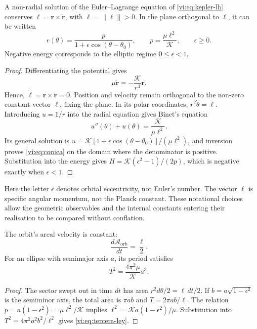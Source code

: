\begin{proposition}
\label{vi:prop:conica}
A non-radial solution of the Euler--Lagrange equation of
\eqref{vi:eq:kepler-lh} conserves
$\boldsymbol\ell=\mathbf r\times\dot{\mathbf r}$, with
$\ell=\|\boldsymbol\ell\|>0$. In the plane orthogonal to
$\boldsymbol\ell$, it can be written
\begin{equation}
 r(\theta)=\frac{p}{1+\epsilon\cos(\theta-\theta_0)},
 \qquad p=\frac{\mu\ell^2}{\mathcal K},
 \qquad \epsilon\geq0.
 \label{vi:eq:conica}
\end{equation}
Negative energy corresponds to the elliptic regime
$0\leq\epsilon<1$.
\end{proposition}
\begin{proof}
Differentiating the potential gives
\begin{equation}
 \mu\ddot{\mathbf r}=-\frac{\mathcal K}{r^3}\mathbf r.
 \label{vi:eq:fuerza-central}
\end{equation}
Hence,
$\dot{\boldsymbol\ell}=\mathbf r\times\ddot{\mathbf r}=0$.
Position and velocity remain orthogonal to the
non-zero constant vector $\boldsymbol\ell$, fixing the plane.
In its polar coordinates, $r^2\dot\theta=\ell$. Introducing
$u=1/r$ into the radial equation gives Binet's equation
\[
 u''(\theta)+u(\theta)=\frac{\mathcal K}{\mu\ell^2}.
\]
Its general solution is
$u=\mathcal K[1+\epsilon\cos(\theta-\theta_0)]/(\mu\ell^2)$,
and inversion proves \eqref{vi:eq:conica} on the domain
where the denominator is positive. Substitution into
the energy gives
$H=\mathcal K(\epsilon^2-1)/(2p)$, which is negative
exactly when $\epsilon<1$.
\end{proof}

Here the letter $\epsilon$ denotes orbital eccentricity,
not Euler's number. The vector $\boldsymbol\ell$ is
specific angular momentum, not the Planck constant.
These notational choices allow the geometric
observables and the internal constants entering their
realisation to be compared without conflation.

\begin{proposition}
\label{vi:prop:ley-areal}
The orbit's areal velocity is constant:
\begin{equation}
 \frac{d\mathcal A_{\mathrm{orb}}}{dt}=\frac\ell2.
 \label{vi:eq:ley-areal}
\end{equation}
For an ellipse with semimajor axis $a$, its period satisfies
\begin{equation}
 T^2=\frac{4\pi^2\mu}{\mathcal K}a^3.
 \label{vi:eq:tercera-ley}
\end{equation}
\end{proposition}
\begin{proof}
The sector swept out in time $dt$ has area
$r^2d\theta/2=\ell\,dt/2$. If $b=a\sqrt{1-\epsilon^2}$
is the semiminor axis, the total area is $\pi ab$ and
$T=2\pi ab/\ell$. The relation
$p=a(1-\epsilon^2)=\mu\ell^2/\mathcal K$ implies
$\ell^2=\mathcal K a(1-\epsilon^2)/\mu$.
Substitution into $T^2=4\pi^2a^2b^2/\ell^2$ gives
\eqref{vi:eq:tercera-ley}.
\end{proof}

